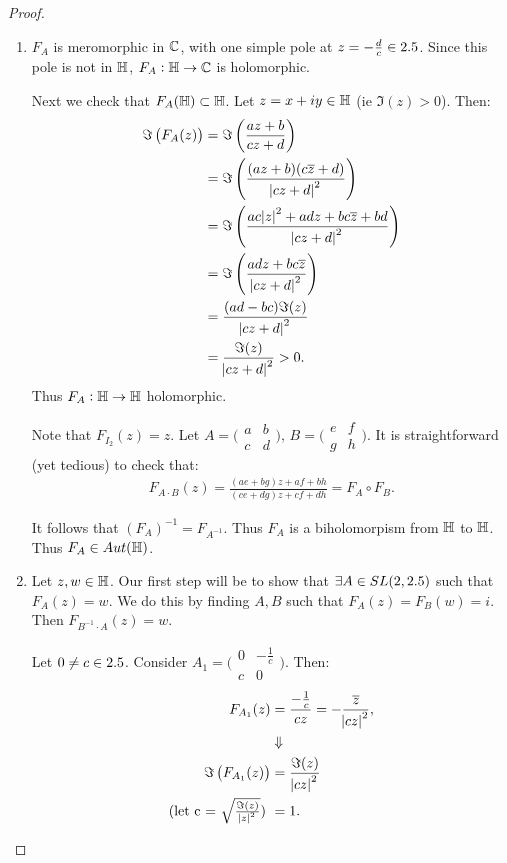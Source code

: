 \begin{proof}
\phantom{a}

\begin{enumerate}
    \item $F_A$ is meromorphic in $\mathbb{C}$, with one simple pole at $z = - \frac{d}{c} \in 2.5$. Since this pole is not in $\mathbb{H}$, $F_A : \mathbb{H} \to \mathbb{C}$ is holomorphic.
    
    Next we check that $F_A(\mathbb{H}) \subset \mathbb{H}$. Let $z = x+iy \in \mathbb{H}$ (ie $\Im(z) >0$). Then:
    \begin{align*}
        \Im \left( F_A(z) \right) &= \Im \left( \frac{az+b}{cz+d} \right)\\
        &= \Im \left( \frac{(az+b)(c\overline{z} +d)}{\abs{cz+d}^2} \right)\\
        &= \Im \left( \frac{ac\abs{z}^2 + adz + bc\overline{z} + bd}{\abs{cz+d}^2} \right)\\
        &= \Im \left( \frac{ adz + bc\overline{z} }{\abs{cz+d}^2} \right)\\
        &= \frac{{}(ad-bc) \Im (z)}{\abs{cz+d}^2}\\
        &= \frac{\Im (z)}{\abs{cz+d}^2} > 0.
    \end{align*}
    Thus $F_A : \mathbb{H} \to \mathbb{H}$ holomorphic.
    
    Note that $F_{I_2} (z) = z$. Let $A= \big(\begin{smallmatrix}
  a & b\\
  c & d
\end{smallmatrix}\big), \, B = \big(\begin{smallmatrix}
  e & f\\
  g & h
\end{smallmatrix}\big)$. It is straightforward (yet tedious) to check that:
\begin{align*}
    F_{A\cdot B} (z) = \frac{(ae+bg)z+af+bh}{(ce+dg)z+cf+dh} = F_A \circ F_B.
\end{align*}

It follows that $(F_A)^{-1} = F_{A^{-1}}$. Thus $F_A$ is a biholomorpism from $\mathbb{H}$ to $\mathbb{H}$. Thus $F_A \in Aut(\mathbb{H})$.
    \item Let $z,w \in \mathbb{H}$. Our first step will be to show that $\exists A \in SL(2, 2.5)$ such that $F_A(z) = w$. We do this by finding $A,B $ such that $F_A(z) = F_B(w) = i$. Then $F_{B^{-1} \cdot A} (z ) = w$.
    
    Let $0 \neq c \in 2.5$. Consider $A_1 = \big(\begin{smallmatrix}
  0 & -\frac{1}{c}\\
  c & 0
\end{smallmatrix}\big)$. Then:
\begin{align*}
    F_{A_1} (z) &= \frac{-\frac{1}{c}}{cz} = - \frac{\overline{z}}{\abs{cz}^2},\\
   &\Downarrow\\
    \Im \left( F_{A_1} (z) \right) &= \frac{\Im (z)}{\abs{cz}^2}\\
    \text{(let c = $\sqrt{\tfrac{\Im (z)}{\abs{z}^2}}$) } &= 1.
\end{align*}


\end{enumerate}
\end{proof}
